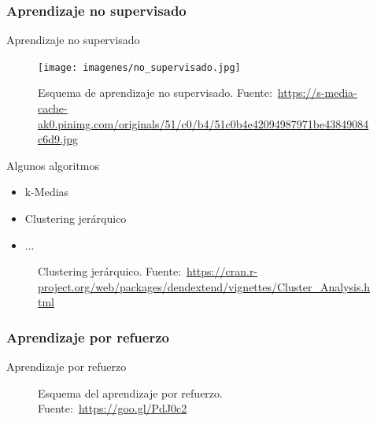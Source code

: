 \documentclass[hyperref={unicode}]{beamer}
\begin{document}
\subsubsection{Aprendizaje no supervisado}
\begin{frame}{Aprendizaje no supervisado}
	\begin{figure}
			\begin{center}
			\texttt{[image: imagenes/no\_supervisado.jpg]}
			\caption{Esquema de aprendizaje no supervisado. Fuente:~\url{https://s-media-cache-ak0.pinimg.com/originals/51/c0/b4/51c0b4e42094987971be43849084c6d9.jpg}}
			\end{center}
	\end{figure}
\end{frame}

\begin{frame}{Algunos algoritmos}

\begin{minipage}{0.3\textwidth}
	\begin{itemize}
		\item k-Medias
		\item Clustering jerárquico
		\item ...
	\end{itemize}
\end{minipage}
\hfill
\begin{minipage}{0.65\textwidth}
	\begin{figure}[htbp!]
		\centering
		\caption{Clustering jerárquico. Fuente:~\url{https://cran.r-project.org/web/packages/dendextend/vignettes/Cluster_Analysis.html}}
	\end{figure}
\end{minipage}
	
\end{frame}



\subsubsection{Aprendizaje por refuerzo}
\begin{frame}{Aprendizaje por refuerzo}
	
	\begin{figure}[htbp!]
			\centering
			\caption{Esquema del aprendizaje por refuerzo. Fuente:~\url{https://goo.gl/PdJ0c2}}
		\end{figure}
\end{frame}
\end{document}
